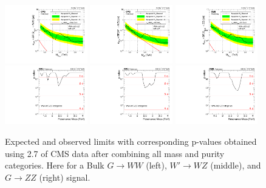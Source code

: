 \begin{figure}[h!]
\centering
\includegraphics[width=0.32\textwidth]{figures/analysis/search1/AN-15-211/limits/brazilianFlag_BulkWW_new_combined_13TeV.pdf}
\includegraphics[width=0.32\textwidth]{figures/analysis/search1/AN-15-211/limits/brazilianFlag_WZ_new_combined_13TeV.pdf}
\includegraphics[width=0.32\textwidth]{figures/analysis/search1/AN-15-211/limits/brazilianFlag_BulkZZ_new_combined_13TeV.pdf}\\
\includegraphics[width=0.32\textwidth]{figures/analysis/search1/AN-15-211/pvalues/pvalue_BulkWWin_combined_new.pdf}
\includegraphics[width=0.32\textwidth]{figures/analysis/search1/AN-15-211/pvalues/pvalue_WZin_combined_new.pdf}
\includegraphics[width=0.32\textwidth]{figures/analysis/search1/AN-15-211/pvalues/pvalue_BulkZZin_combined_new.pdf}\\
\caption{Expected and observed limits with corresponding p-values obtained using 2.7 \fbinv of CMS data after combining all mass and purity categories. Here for a Bulk $G\rightarrow WW$ (left), $W'\rightarrow WZ$ (middle), and $G\rightarrow ZZ$ (right) signal.}
\label{fig:searchI:Limits_CombNew}
\end{figure}
